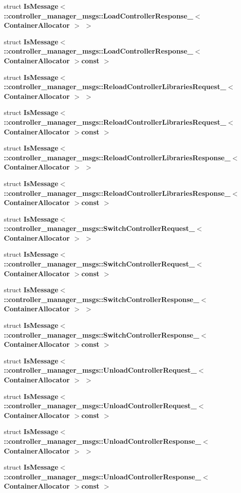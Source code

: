 \begin{DoxyCompactItemize}
\item 
struct {\bf \-Is\-Message$<$ \-::controller\-\_\-manager\-\_\-msgs\-::\-Load\-Controller\-Response\-\_\-$<$ Container\-Allocator $>$ $>$}
\item 
struct {\bf \-Is\-Message$<$ \-::controller\-\_\-manager\-\_\-msgs\-::\-Load\-Controller\-Response\-\_\-$<$ Container\-Allocator $>$const  $>$}
\item 
struct {\bf \-Is\-Message$<$ \-::controller\-\_\-manager\-\_\-msgs\-::\-Reload\-Controller\-Libraries\-Request\-\_\-$<$ Container\-Allocator $>$ $>$}
\item 
struct {\bf \-Is\-Message$<$ \-::controller\-\_\-manager\-\_\-msgs\-::\-Reload\-Controller\-Libraries\-Request\-\_\-$<$ Container\-Allocator $>$const  $>$}
\item 
struct {\bf \-Is\-Message$<$ \-::controller\-\_\-manager\-\_\-msgs\-::\-Reload\-Controller\-Libraries\-Response\-\_\-$<$ Container\-Allocator $>$ $>$}
\item 
struct {\bf \-Is\-Message$<$ \-::controller\-\_\-manager\-\_\-msgs\-::\-Reload\-Controller\-Libraries\-Response\-\_\-$<$ Container\-Allocator $>$const  $>$}
\item 
struct {\bf \-Is\-Message$<$ \-::controller\-\_\-manager\-\_\-msgs\-::\-Switch\-Controller\-Request\-\_\-$<$ Container\-Allocator $>$ $>$}
\item 
struct {\bf \-Is\-Message$<$ \-::controller\-\_\-manager\-\_\-msgs\-::\-Switch\-Controller\-Request\-\_\-$<$ Container\-Allocator $>$const  $>$}
\item 
struct {\bf \-Is\-Message$<$ \-::controller\-\_\-manager\-\_\-msgs\-::\-Switch\-Controller\-Response\-\_\-$<$ Container\-Allocator $>$ $>$}
\item 
struct {\bf \-Is\-Message$<$ \-::controller\-\_\-manager\-\_\-msgs\-::\-Switch\-Controller\-Response\-\_\-$<$ Container\-Allocator $>$const  $>$}
\item 
struct {\bf \-Is\-Message$<$ \-::controller\-\_\-manager\-\_\-msgs\-::\-Unload\-Controller\-Request\-\_\-$<$ Container\-Allocator $>$ $>$}
\item 
struct {\bf \-Is\-Message$<$ \-::controller\-\_\-manager\-\_\-msgs\-::\-Unload\-Controller\-Request\-\_\-$<$ Container\-Allocator $>$const  $>$}
\item 
struct {\bf \-Is\-Message$<$ \-::controller\-\_\-manager\-\_\-msgs\-::\-Unload\-Controller\-Response\-\_\-$<$ Container\-Allocator $>$ $>$}
\item 
struct {\bf \-Is\-Message$<$ \-::controller\-\_\-manager\-\_\-msgs\-::\-Unload\-Controller\-Response\-\_\-$<$ Container\-Allocator $>$const  $>$}

\end{DoxyCompactItemize}
